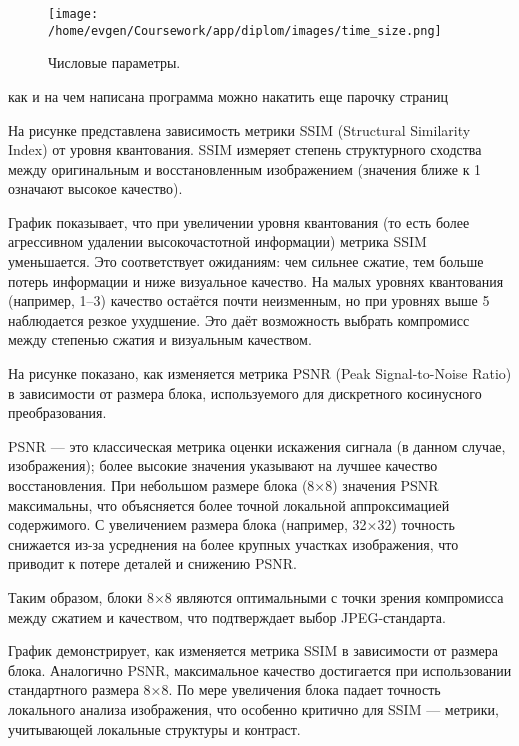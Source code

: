 \begin{figure}[h!]
    \centering
    \texttt{[image: /home/evgen/Coursework/app/diplom/images/time\_size.png]}
    \caption{Числовые параметры.}
    \label{fig:time_size}
\end{figure}

как и на чем написана программа можно накатить еще парочку страниц



\clearpage



На рисунке представлена зависимость метрики SSIM (Structural Similarity Index) от уровня квантования. 
SSIM измеряет степень структурного сходства между оригинальным и восстановленным изображением 
(значения ближе к 1 означают высокое качество).

График показывает, что при увеличении уровня квантования 
(то есть более агрессивном удалении высокочастотной информации) метрика SSIM уменьшается. 
Это соответствует ожиданиям: чем сильнее сжатие, тем больше потерь информации и ниже визуальное качество. 
На малых уровнях квантования (например, 1–3) качество остаётся почти неизменным, но при уровнях выше 5 наблюдается резкое ухудшение. 
Это даёт возможность выбрать компромисс между степенью сжатия и визуальным качеством.


На рисунке показано, как изменяется метрика PSNR (Peak Signal-to-Noise Ratio) в зависимости от размера блока, 
используемого для дискретного косинусного преобразования.

PSNR — это классическая метрика оценки искажения сигнала (в данном случае, изображения); 
более высокие значения указывают на лучшее качество восстановления. При небольшом размере блока 
(8×8) значения PSNR максимальны, что объясняется более точной локальной аппроксимацией содержимого. 
С увеличением размера блока (например, 32×32) точность снижается из-за усреднения на более крупных 
участках изображения, что приводит к потере деталей и снижению PSNR.

Таким образом, блоки 8×8 являются оптимальными с точки зрения компромисса между сжатием и качеством, 
что подтверждает выбор JPEG-стандарта.

График демонстрирует, как изменяется метрика SSIM в зависимости от размера блока. 
Аналогично PSNR, максимальное качество достигается при использовании стандартного размера 8×8. 
По мере увеличения блока падает точность локального анализа изображения, 
что особенно критично для SSIM — метрики, учитывающей локальные структуры и контраст.

